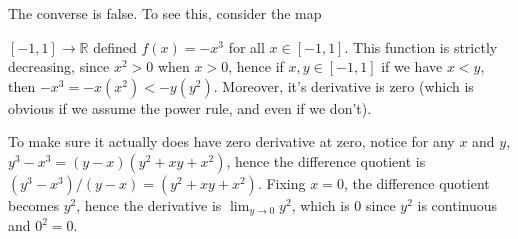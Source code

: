 \documentclass[11pt]{article}
\newcommand{\R}{\mathbb{R}}
\theoremstyle{definition}
\begin{document}
The converse is false. To see this, consider the map 

$[-1,1]\to \R$ defined $f(x) = -x^3$ for all $x\in [-1,1]$. This function is strictly decreasing, since $x^2>0$ when $x>0$, hence if $x, y\in [-1,1]$ if we have $x< y$, then $-x^3 = -x(x^2) < -y(y^2)$. Moreover, it's derivative is zero (which is obvious if we assume the power rule, and even if we don't).

To make sure it actually does have zero derivative at zero, notice for any $x$ and $y$, $y^3 - x^3 = (y - x)(y^2 + xy + x^2) $, hence the difference quotient is 
$(y^3 - x^3)/(y-x) = (y^2 + xy + x^2)$. Fixing $x = 0$, the difference quotient becomes $y^2$, hence the derivative is $\lim_{y\to 0}y^2$, which is $0$ since $y^2$ is continuous and $0^2 = 0$. 
\end{document}
